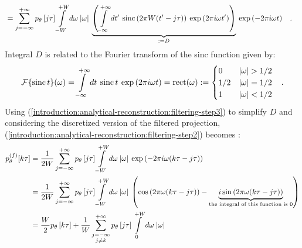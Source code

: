 {\begin{align}
	              &= \sum\limits_{j=-\infty}^{+\infty} p_{\theta}\left[j\tau\right] \int\limits_{-W}^{+W} d\omega\:|\omega| \: \underbrace{\left( \int\limits_{-\infty}^{+\infty} dt' \: 
	                        \operatorname{sinc}\left( 2\pi W(t' - j\tau)\right)
	                        \: \exp\left(2\pi i\omega t'\right) \right)}_{:= D} \:\exp\left(-2\pi i\omega t\right) \hspace{0.3cm}. 
  \label{introduction:analytical-reconstruction:filtering-step2}				  
\end{align}
Integral $D$ is related to the Fourier transform of the sinc function given by:
\begin{equation}
  \operatorname{\mathcal{F}}\{\operatorname{sinc} t\}(\omega) = \int\limits_{-\infty}^{+\infty} dt \: \operatorname{sinc} t \: \exp\left( 2\pi i\omega t\right) = \operatorname{rect}(\omega) :=
  \begin{cases}
    0 & |\omega| > 1/2 \\
    1/2 & |\omega| = 1/2 \\
    1 & |\omega| < 1/2 
  \end{cases}\hspace*{0.3cm}.
  \label{introduction:analytical-reconstruction:filtering-step3}
\end{equation}
Using (\ref{introduction:analytical-reconstruction:filtering-step3}) to simplify $D$ and considering the discretized version
of the filtered projection,
(\ref{introduction:analytical-reconstruction:filtering-step2}) becomes \cite{Murrell1996}:
\begin{align}
\allowdisplaybreaks[2]
      p_{\theta}^{(f)}[k\tau] &= \frac{1}{2W} \sum\limits_{j=-\infty}^{+\infty} p_{\theta}\left[j\tau\right] 
                                  \int\limits_{-W}^{+W} d\omega \: |\omega| \: \exp\left( -2\pi i\omega (k\tau-j\tau)\right) \nonumber\\
                          &= \frac{1}{2W}\sum\limits_{j=-\infty}^{+\infty} p_{\theta}\left[j\tau\right] \int\limits_{-W}^{+W} d\omega\:|\omega|
                              \: \left(\cos\left( 2\pi \omega (k\tau-j\tau)\right)
                                     - \underbrace{ i \sin\left( 2\pi \omega (k\tau-j\tau) \right)}_{ 
                                 \text{the integral of this function is 0}}\right) \nonumber\\
                          &= \frac{W}{2}p_{\theta}\left[k\tau\right] + \frac{1}{W}\sum\limits_{\substack{j=-\infty\\j\neq k}}^{+\infty} 
                                   p_{\theta}\left[j\tau\right] \int\limits_{0}^{+W} d\omega\:|\omega| \: 

\end{align}}
